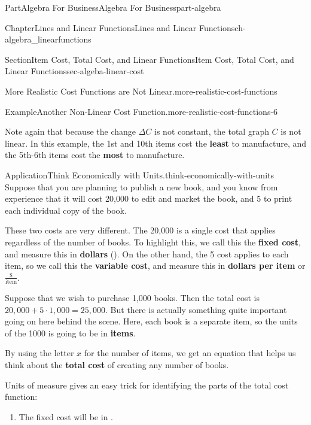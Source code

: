 \documentclass[oneside,10pt,]{tufte-book}
\newcommand{\terminology}[1]{\textbf{#1}}
\numberwithin{equation}{chapter}
\def \tikzhistogram (#1,#2){\draw[fill=blue,opacity=0.3] ({#1+((\xtwo-\xmin)/5)},#2) rectangle ({#1-((\xtwo-\xmin)/5)},0); \draw[draw,thick] ({#1+((\xtwo-\xmin)/5)},#2) rectangle ({#1-((\xtwo-\xmin)/5)},0); \node[draw,fill=blue, circle,inner sep=2.5pt] at (#1,#2) {};}
\begin{document}
\begin{partptx}{Part}{Algebra For Business}{}{Algebra For Business}{}{}{part-algebra}
\begin{chapterptx}{Chapter}{Lines and Linear Functions}{}{Lines and Linear Functions}{}{}{ch-algebra_linearfunctions}
\begin{sectionptx}{Section}{Item Cost, Total Cost, and Linear Functions}{}{Item Cost, Total Cost, and Linear Functions}{}{}{sec-algeba-linear-cost}
\begin{paragraphs}{More Realistic Cost Functions are Not Linear.}{more-realistic-cost-functions}
\begin{example}{Example}{Another Non-Linear Cost Function.}{more-realistic-cost-functions-6}
\begin{image}{0.125}{0.75}{0.125}{}
{
}%
\end{image}%
Note again that because the change \(\Delta C\) is not constant, the total graph \(C\) is not linear. In this example, the 1st and 10th items cost the \terminology{least} to manufacture, and the 5th-6th items cost the \terminology{most} to manufacture.%
\end{example}
\end{paragraphs}%
\begin{insight}{Application}{Think Economically with Units.}{think-economically-with-units}%
Suppose that you are planning to publish a new book, and you know from experience that it will cost \textdollar{}20,000 to edit and market the book, and \textdollar{}5 to print each individual copy of the book.%
\par
These two costs are very different. The \textdollar{}20,000 is a single cost that applies regardless of the number of books. To highlight this, we call this the \terminology{fixed cost}, and measure this in \terminology{dollars} (\textdollar{}). On the other hand, the \textdollar{}5 cost applies to each item, so we call this the \terminology{variable cost}, and measure this in \terminology{dollars per item} or \(\frac{\$}{\text{item}}\).%
\par
Suppose that we wish to purchase 1,000 books. Then the total cost is \(20,000 + 5\cdot 1,000 = 25,000\). But there is actually something quite important going on here behind the scene. Here, each book is a separate item, so the units of the 1000 is going to be in \terminology{items}.%
\par
By using the letter \(x\) for the number of items, we get an equation that helps us think about the \terminology{total cost} of creating any number of books.%
\par
Units of measure gives an easy trick for identifying the parts of the total cost function:%
\par
%
\begin{enumerate}
\item{}The fixed cost will be in \textdollar{}.%

\end{enumerate}
\end{insight}
\end{sectionptx}
\end{chapterptx}
\end{partptx}
\end{document}
